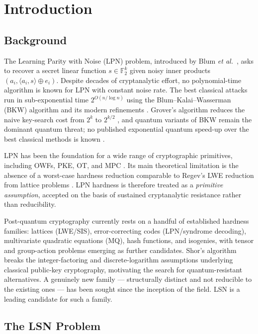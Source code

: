 \documentclass[11pt,a4paper]{article}
\theoremstyle{plain}
\theoremstyle{definition}
\newcommand{\F}{\mathbb{F}}
\newcommand{\etal}{\textit{et al.}}
\begin{document}
\section{Introduction}
\label{sec:intro}

\subsection{Background}
\label{subsec:background}

The Learning Parity with Noise (LPN) problem, introduced by Blum \etal\ \cite{BFKL94}, asks to recover a secret linear function $s \in \F_2^k$ given noisy inner products $(a_i, \langle a_i, s \rangle \oplus e_i)$. Despite decades of cryptanalytic effort, no polynomial-time algorithm is known for LPN with constant noise rate. The best classical attacks run in sub-exponential time $2^{O(n / \log n)}$ using the Blum--Kalai--Wasserman (BKW) algorithm \cite{BKW03} and its modern refinements \cite{LF06,Lyu05,EKM17,GJL14,ZJW16,WS21}. Grover's algorithm reduces the naive key-search cost from $2^k$ to $2^{k/2}$ \cite{Gro96}, and quantum variants of BKW remain the dominant quantum threat; no published exponential quantum speed-up over the best classical methods is known \cite{Kir11}.

LPN has been the foundation for a wide range of cryptographic primitives, including OWFs, PKE, OT, and MPC \cite{ABW10,Ale11,DGM14,BCGI18}. Its main theoretical limitation is the absence of a worst-case hardness reduction comparable to Regev's LWE reduction from lattice problems \cite{Reg05}. LPN hardness is therefore treated as a \emph{primitive assumption}, accepted on the basis of sustained cryptanalytic resistance rather than reducibility.

Post-quantum cryptography currently rests on a handful of established hardness families: lattices (LWE/SIS), error-correcting codes (LPN/syndrome decoding), multivariate quadratic equations (MQ), hash functions, and isogenies, with tensor and group-action problems emerging as further candidates. Shor's algorithm \cite{Sho94} breaks the integer-factoring and discrete-logarithm assumptions underlying classical public-key cryptography, motivating the search for quantum-resistant alternatives. A genuinely new family --- structurally distinct and not reducible to the existing ones --- has been sought since the inception of the field. LSN is a leading candidate for such a family.

\subsection{The LSN Problem}
\label{subsec:lsn}
\end{document}
